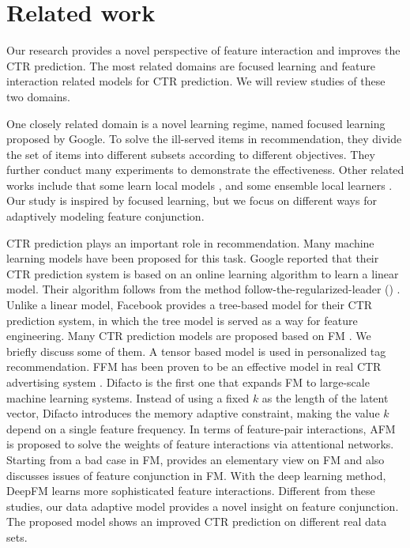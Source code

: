 \section{Related work}
Our research provides a novel perspective of feature interaction and improves the CTR prediction. The most related domains are focused learning and feature interaction related models for CTR prediction. We will review studies of these two domains.

One closely related domain is a novel learning regime, named focused learning \cite{Beutel:2017:BGO:3038912.3052713} proposed by Google. To solve the ill-served items in recommendation, they divide the set of items into different subsets according to different objectives. They further conduct many experiments to demonstrate the effectiveness. Other related works include that some learn local models \cite{Christakopoulou:2016:LIM:2959100.2959185}, and some ensemble local learners \cite{Beutel:2015:AAC:2736277.2741091}. Our study is inspired by focused learning, but we focus on different ways for adaptively modeling feature conjunction.

CTR prediction plays an important role in recommendation. Many machine learning models have been proposed for this task. Google \cite{McMahan:2013:ACP:2487575.2488200} reported that their CTR prediction system is based on an online learning algorithm to learn a linear model. Their algorithm follows from the method follow-the-regularized-leader () \cite{pmlr-v15-mcmahan11b}. Unlike a linear model, Facebook \cite{He:2014:PLP:2648584.2648589} provides a tree-based model for their CTR prediction system, in which the tree model is served as a way for feature engineering. Many CTR prediction models are proposed based on FM \cite{5694074}. We briefly discuss some of them. A tensor based model \cite{Rendle:2010:PIT:1718487.1718498} is used in personalized tag recommendation. FFM \cite{Juan:2016:FFM:2959100.2959134} has been proven to be an effective model in real CTR advertising system \cite{Juan:2017:FFM:3041021.3054185}. Difacto \cite{Li:2016:DDF:2835776.2835781} is the first one that expands FM to large-scale machine learning systems. Instead of using a fixed $k$ as the length of the latent vector, Difacto introduces the memory adaptive constraint, making the value $k$ depend on a single feature frequency. In terms of feature-pair interactions, AFM \cite{ijcai2017-435} is proposed to solve the weights of feature interactions via attentional networks. Starting from a bad case in FM, \cite{Prillo:2017:EVF:3109859.3109892} provides an elementary view on FM and also discusses issues of feature conjunction in FM. With the deep learning method, DeepFM \cite{Guo:2017:DFB:3172077.3172127} learns more sophisticated feature interactions. Different from these studies, our data adaptive model provides a novel insight on feature conjunction. The proposed model shows an improved CTR prediction on different real data sets.
